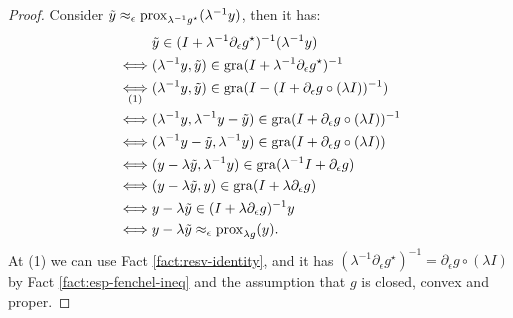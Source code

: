 \documentclass[12pt]{article}
\begin{document}
        \begin{proof}
            Consider $\tilde y \approx_\epsilon \operatorname{prox}_{\lambda^{-1}g^\star}(\lambda^{-1}y)$, then it has: 
            \begin{align*}
                & 
                \tilde y 
                \in (I + \lambda^{-1}\partial_\epsilon g^\star)^{-1}(\lambda^{-1}y)
                \\
                \iff &
                (\lambda^{-1}y, \tilde y)\in 
                \operatorname{gra}(I + \lambda^{-1}\partial_\epsilon g^\star)^{-1}
                \\
                \underset{(1)}{\iff} &
                (\lambda^{-1}y, \tilde y)\in 
                \operatorname{gra}(I - (I + \partial_\epsilon g\circ(\lambda I))^{-1})
                \\
                \iff &
                (\lambda^{-1}y, \lambda^{-1}y - \tilde y)\in 
                \operatorname{gra}(I + \partial_\epsilon g\circ(\lambda I))^{-1}
                \\
                \iff &
                (\lambda^{-1}y - \tilde y, \lambda^{-1}y)\in 
                \operatorname{gra}(I + \partial_\epsilon g\circ(\lambda I))
                \\
                \iff &
                (y - \lambda\tilde y, \lambda^{-1}y)\in 
                \operatorname{gra}(\lambda^{-1}I + \partial_\epsilon g)
                \\
                \iff &
                (y - \lambda\tilde y, y)\in 
                \operatorname{gra}(I + \lambda\partial_\epsilon g)
                \\
                \iff& 
                y - \lambda \tilde y \in 
                (I + \lambda \partial_\epsilon g)^{-1}y
                \\
                \iff& 
                y - \lambda \tilde y \approx_\epsilon \operatorname{prox}_{\lambda g}(y). 
            \end{align*}
            At (1) we can use Fact \ref{fact:resv-identity}, and it has $(\lambda^{-1}\partial_\epsilon g^\star)^{-1} = \partial_\epsilon g\circ(\lambda I)$ by Fact \ref{fact:esp-fenchel-ineq} and the assumption that $g$ is closed, convex and proper. 
        \end{proof}
        \begin{fact}
            
        \end{fact}
\end{document}
